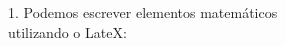 \documentclass[preview]{standalone}
\begin{document}
\begin{center}
1. Podemos escrever elementos matemáticos \\ utilizando o LateX:
\end{center}
\end{document}
